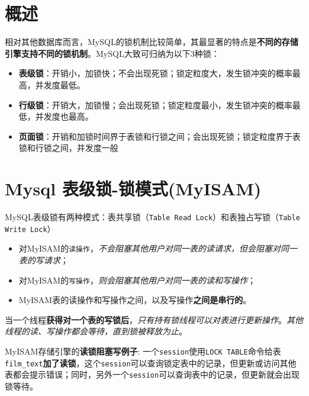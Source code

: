 \documentclass[UTF8,a4paper,12pt]{ctexbook}
\begin{document}
	
	\section{概述}
		  相对其他数据库而言，MySQL的锁机制比较简单，其最显著的特点是\textbf{不同的存储引擎支持不同的锁机制}。MySQL大致可归纳为以下3种锁：
		  
		  \begin{itemize}
			  	\item \textbf{表级锁}：开销小，加锁快；不会出现死锁；锁定粒度大，发生锁冲突的概率最高，并发度最低。
			  	\item \textbf{行级锁}：开销大，加锁慢；会出现死锁；锁定粒度最小，发生锁冲突的概率最低，并发度也最高。
			  	\item \textbf{页面锁}：开销和加锁时间界于表锁和行锁之间；会出现死锁；锁定粒度界于表锁和行锁之间，并发度一般
		  \end{itemize}
	
	
	\section{Mysql 表级锁-锁模式(MyISAM)}
		MySQL表级锁有两种模式：表共享锁（\verb|Table Read Lock|）和表独占写锁（\verb|Table Write Lock|）
	
		\begin{itemize}
			\item 对MyISAM的\verb|读操作|，\textit{不会阻塞其他用户对同一表的读请求，但会阻塞对同一表的写请求}；
			\item 对MyISAM的\verb|写操作|，\textit{则会阻塞其他用户对同一表的读和写操作}；
			\item MyISAM表的读操作和写操作之间，以及写操作\textbf{之间是串行的}。
		\end{itemize}

		当一个线程\textbf{获得对一个表的写锁后}，\textit{只有持有锁线程可以对表进行更新操作}。\textit{其他线程的读、写操作都会等待，直到锁被释放为止}。
		
		
		MyISAM存储引擎的\textbf{读锁阻塞写例子}: 
		一个\verb|session|使用\verb|LOCK TABLE|命令给表\verb|film_text|\textbf{加了读锁}，这个\verb|session|可以查询锁定表中的记录，但更新或访问其他表都会提示错误；同时，另外一个\verb|session|可以查询表中的记录，但更新就会出现锁等待。
		
\end{document}
